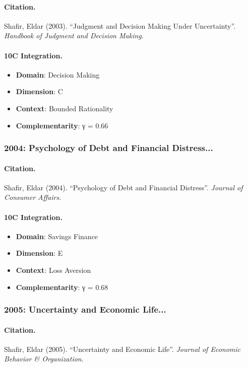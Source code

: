 \paragraph{Citation.}
Shafir, Eldar (2003). ``Judgment and Decision Making Under Uncertainty''. \textit{Handbook of Judgment and Decision Making}.

\paragraph{10C Integration.}
\begin{itemize}[nosep]
  \item \textbf{Domain}: Decision Making
  \item \textbf{Dimension}: C
  \item \textbf{Context}: Bounded Rationality
  \item \textbf{Complementarity}: γ = 0.66
\end{itemize}


\subsubsection{2004: Psychology of Debt and Financial Distress...}

\paragraph{Citation.}
Shafir, Eldar (2004). ``Psychology of Debt and Financial Distress''. \textit{Journal of Consumer Affairs}.

\paragraph{10C Integration.}
\begin{itemize}[nosep]
  \item \textbf{Domain}: Savings Finance
  \item \textbf{Dimension}: E
  \item \textbf{Context}: Loss Aversion
  \item \textbf{Complementarity}: γ = 0.68
\end{itemize}


\subsubsection{2005: Uncertainty and Economic Life...}

\paragraph{Citation.}
Shafir, Eldar (2005). ``Uncertainty and Economic Life''. \textit{Journal of Economic Behavior & Organization}.

